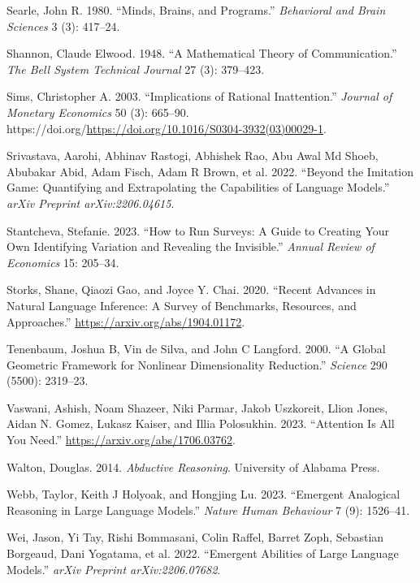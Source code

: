 \documentclass[
]{article}
\newlength{\cslhangindent}
\newenvironment{CSLReferences}[2] %
 {\begin{list}{}{%
  \setlength{\itemindent}{0pt}
  \setlength{\leftmargin}{0pt}
  \setlength{\parsep}{0pt}
  \ifodd #1
   \setlength{\leftmargin}{\cslhangindent}
   \setlength{\itemindent}{-1\cslhangindent}
  \fi
  \setlength{\itemsep}{#2\baselineskip}}}
 {\end{list}}
\theoremstyle{plain}
\theoremstyle{definition}
\theoremstyle{remark}
\begin{document}
\begin{CSLReferences}{1}{0}
Searle, John R. 1980. {``Minds, Brains, and Programs.''}
\emph{Behavioral and Brain Sciences} 3 (3): 417--24.

Shannon, Claude Elwood. 1948. {``A Mathematical Theory of
Communication.''} \emph{The Bell System Technical Journal} 27 (3):
379--423.

Sims, Christopher A. 2003. {``Implications of Rational Inattention.''}
\emph{Journal of Monetary Economics} 50 (3): 665--90.
https://doi.org/\url{https://doi.org/10.1016/S0304-3932(03)00029-1}.

Srivastava, Aarohi, Abhinav Rastogi, Abhishek Rao, Abu Awal Md Shoeb,
Abubakar Abid, Adam Fisch, Adam R Brown, et al. 2022. {``Beyond the
Imitation Game: Quantifying and Extrapolating the Capabilities of
Language Models.''} \emph{arXiv Preprint arXiv:2206.04615}.

Stantcheva, Stefanie. 2023. {``How to Run Surveys: A Guide to Creating
Your Own Identifying Variation and Revealing the Invisible.''}
\emph{Annual Review of Economics} 15: 205--34.

Storks, Shane, Qiaozi Gao, and Joyce Y. Chai. 2020. {``Recent Advances
in Natural Language Inference: A Survey of Benchmarks, Resources, and
Approaches.''} \url{https://arxiv.org/abs/1904.01172}.

Tenenbaum, Joshua B, Vin de Silva, and John C Langford. 2000. {``A
Global Geometric Framework for Nonlinear Dimensionality Reduction.''}
\emph{Science} 290 (5500): 2319--23.

Vaswani, Ashish, Noam Shazeer, Niki Parmar, Jakob Uszkoreit, Llion
Jones, Aidan N. Gomez, Lukasz Kaiser, and Illia Polosukhin. 2023.
{``Attention Is All You Need.''} \url{https://arxiv.org/abs/1706.03762}.

Walton, Douglas. 2014. \emph{Abductive Reasoning}. University of Alabama
Press.

Webb, Taylor, Keith J Holyoak, and Hongjing Lu. 2023. {``Emergent
Analogical Reasoning in Large Language Models.''} \emph{Nature Human
Behaviour} 7 (9): 1526--41.

Wei, Jason, Yi Tay, Rishi Bommasani, Colin Raffel, Barret Zoph,
Sebastian Borgeaud, Dani Yogatama, et al. 2022. {``Emergent Abilities of
Large Language Models.''} \emph{arXiv Preprint arXiv:2206.07682}.


\end{CSLReferences}
\end{document}
